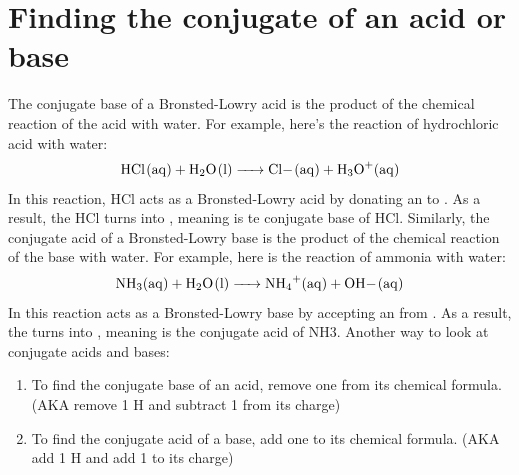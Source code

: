 \documentclass{article}  %
\begin{document}
\section*{Finding the conjugate of an acid or base}
The conjugate base of a Bronsted-Lowry acid is the product of the chemical reaction of the acid with water. For example, here's the reaction of hydrochloric acid  with water: 
\begin{equation*}
    \begin{aligned}
        \ce{HCl_(aq) + H2O_(l) -> Cl-_(aq) + H3O+_(aq)}
    \end{aligned}
\end{equation*}
In this reaction, HCl acts as a Bronsted-Lowry acid by donating an  to . As a result, the HCl turns into , meaning  is te conjugate base of HCl. 
\newline
Similarly, the conjugate acid of a Bronsted-Lowry base is the product of the chemical reaction of the base with water. For example, here is the reaction of ammonia  with water:
\begin{equation*}
    \begin{aligned}
        \ce{NH3_(aq) + H2O_(l) -> NH4+_(aq) + OH-_(aq)}
    \end{aligned}
\end{equation*}
In this reaction  acts as a Bronsted-Lowry base by accepting an  from . As a result, the  turns into , meaning  is the conjugate acid of NH3.
\newline
Another way to look at conjugate acids and bases:
\begin{enumerate}
    \item To find the conjugate base of an acid, remove one  from its chemical formula. (AKA remove 1 H and subtract 1 from its charge)
    \item To find the conjugate acid of a base, add one  to its chemical formula. (AKA add 1 H and add 1 to its charge)
\end{enumerate}
\end{document}
